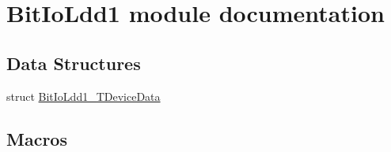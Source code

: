 \hypertarget{group___bit_io_ldd1__module}{}\section{Bit\+Io\+Ldd1 module documentation}
\label{group___bit_io_ldd1__module}
\subsection*{Data Structures}
\begin{DoxyCompactItemize}
\item 
struct \hyperlink{struct_bit_io_ldd1___t_device_data}{Bit\+Io\+Ldd1\+\_\+\+T\+Device\+Data}
\end{DoxyCompactItemize}
\subsection*{Macros}
